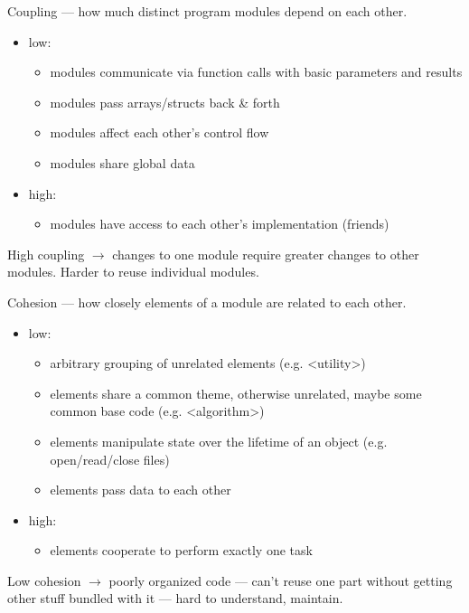 \documentclass{article}
\begin{document}
Coupling --- how much distinct program modules depend on each other.
\begin{itemize}
    \item low:
    \begin{itemize}
        \item modules communicate via function calls with basic parameters and results
        \item modules pass arrays/structs back \& forth
        \item modules affect each other's control flow
        \item modules share global data
    \end{itemize}
    \item high:
    \begin{itemize}
        \item modules have access to each other's implementation (friends)
    \end{itemize}
\end{itemize}

High coupling $\rightarrow$ changes to one module require greater changes to other modules. Harder to reuse individual modules.


Cohesion --- how closely elements of a module are related to each other.
\begin{itemize}
    \item low:
    \begin{itemize}
        \item arbitrary grouping of unrelated elements (e.g. <utility>)
        \item elements share a common theme, otherwise unrelated, maybe some common base code (e.g. <algorithm>)
        \item elements manipulate state over the lifetime of an object (e.g. open/read/close files)
        \item elements pass data to each other
    \end{itemize}
    \item high:
    \begin{itemize}
        \item elements cooperate to perform exactly one task
    \end{itemize}
\end{itemize}


Low cohesion $\rightarrow$ poorly organized code --- can't reuse one part without getting other stuff bundled with it --- hard to understand, maintain.
\end{document}
